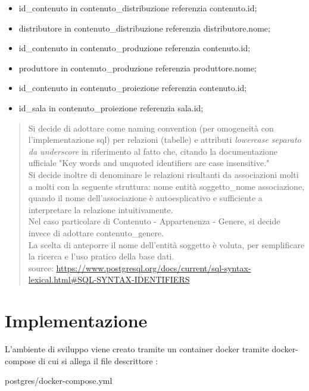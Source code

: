 \documentclass[a4paper]{article}
\begin{document}
\begin{itemize}
  \item id\_contenuto in contenuto\_distribuzione referenzia contenuto.id;\\
  \item distributore in contenuto\_distribuzione referenzia distributore.nome;\\
  \item id\_contenuto in contenuto\_produzione referenzia contenuto.id;\\
  \item produttore in contenuto\_produzione referenzia produttore.nome;\\
  \item id\_contenuto in contenuto\_proiezione referenzia contenuto.id;\\
  \item id\_sala in contenuto\_proiezione referenzia sala.id;\\
\end{itemize}


\begin{quotation}\footnotesize
  Si decide di adottare come naming convention (per omogeneità con l'implementazione sql) per relazioni (tabelle) 
  e attributi \emph{lowercase separato da underscore}
  in riferimento al fatto che, citando la documentazione ufficiale 
  "Key words and unquoted identifiers are case insensitive."\\
  Si decide inoltre di denominare le relazioni risultanti da associazioni molti a molti con la seguente struttura:
  {nome entità soggetto}\_{nome associazione}, quando il nome dell'associazione è autoesplicativo e sufficiente
  a interpretare la relazione intuitivamente.\\
  Nel caso particolare di Contenuto - Appartenenza - Genere, si decide invece di adottare contenuto\_genere.\\
  La scelta di anteporre il nome dell'entità soggetto è voluta, per semplificare la ricerca e l'uso pratico 
  della base dati.\\
  source: \url{https://www.postgresql.org/docs/current/sql-syntax-lexical.html#SQL-SYNTAX-IDENTIFIERS}
\end{quotation}
\clearpage
\section{Implementazione}
L'ambiente di sviluppo viene creato tramite un container docker tramite docker-compose di cui si 
allega il file descrittore :

{postgres/docker-compose.yml}
\end{document}
